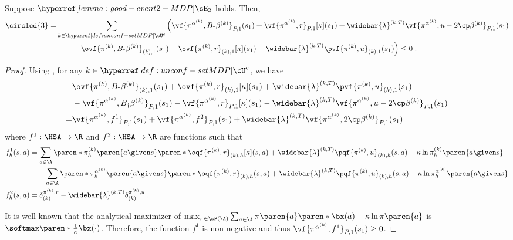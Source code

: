 \begin{lemma}\label{lemma:optimism-composite}
Suppose $\confevent$ holds. Then,
\begin{align*}
\circled{3} = 
&\sum_{k\in \unconfMDP^c} 
\Big(\vf{\pi^{\alpha^{(k)}}, B_\dagger \beta^{(k)}}_{P, 1}(s_1) 
+ \vf{\pi^{\alpha^{(k)}}, r}_{P, 1}[\kappa](s_1)
+ \widebar{\lambda}^{(k, T)} \vf{\pi^{\alpha^{(k)}}, u - 2\cp \beta^{(k)}}_{P, 1}(s_1)\\
&
\quad\quad
- \ovf{\pi^{(k)}, B_\dagger \beta^{(k)}}_{(k), 1}(s_1)
- \ovf{\pi^{(k)}, r}_{(k), 1}[\kappa](s_1)
- \widebar{\lambda}^{(k, T)} \pvf{\pi^{(k)}, u}_{(k), 1}(s_1)
\Big) \leq 0\;.
\end{align*}
\end{lemma}
\begin{proof}
Using , for any $k \in \unconfMDP^c$, we have
\begin{align*}
& \ovf{\pi^{(k)}, B_\dagger \beta^{(k)}}_{(k), 1}(s_1)
+\ovf{\pi^{(k)}, r}_{(k), 1}[\kappa](s_1)
+\widebar{\lambda}^{(k, T)} \pvf{\pi^{(k)}, u}_{(k), 1}(s_1) \\
& -\vf{\pi^{\alpha^{(k)}}, B_\dagger \beta^{(k)}}_{P, 1}(s_1) 
- \vf{\pi^{\alpha^{(k)}}, r}_{P, 1}[\kappa](s_1)
- \widebar{\lambda}^{(k, T)} \vf{\pi^{\alpha^{(k)}}, u - 2\cp \beta^{(k)}}_{P, 1}(s_1)\\
=&
\vf{\pi^{\alpha^{(k)}}, f^1}_{P, 1}(s_1) 
+ \vf{\pi^{\alpha^{(k)}}, f^2}_{P, 1}(s_1) 
+ \widebar{\lambda}^{(k, T)}\vf{\pi^{\alpha^{(k)}}, 2\cp \beta^{(k)}}_{P, 1}(s_1) 
\end{align*}
where $f^1: \HSA\to \R$ and $f^2: \HSA\to \R$ are functions such that
\begin{align*}
f^1_h(s, a) &= 
\sum_{a \in \A}
\paren*{
\pi^{(k)}_h\paren{a \given s} 
\paren*{\oqf{\pi^{(k)}, r}_{(k), h}[\kappa](s, a) + \widebar{\lambda}^{(k, T)} \pqf{\pi^{(k)}, u}_{(k), h}(s, a)
- \kappa \ln \pi^{(k)}_h\paren{a \given s}}
}\\
&\quad - 
\sum_{a \in \A}
\paren*{
\pi^{\alpha^{(k)}}_h\paren{a \given s} 
\paren*{\oqf{\pi^{(k)}, r}_{(k), h}(s, a) + \widebar{\lambda}^{(k, T)} \pqf{\pi^{(k)}, u}_{(k), h}(s, a)
- \kappa \ln \pi^{\alpha^{(k)}}_h\paren{a \given s}}
}\\
f^2_h(s, a) &= \delta^{\pi^{(k)}, r}_{(k)} - \widebar{\lambda}^{(k, T)}\delta^{\pi^{(k)}, u}_{(k)}\;.
\end{align*}

It is well-known that the analytical maximizer of 
\(
\max_{\pi \in \sP(\A)}
\sum_{a \in \A}
\pi\paren{a} \paren*{\bx(a) - \kappa \ln \pi\paren{a}}
\) is $\softmax\paren*{\frac{1}{\kappa} \bx(\cdot)}$. Therefore, the function $f^1$ is non-negative and thus $\vf{\pi^{\alpha^{(k)}}, f^1}_{P, 1}(s_1) \geq 0$.


\end{proof}
